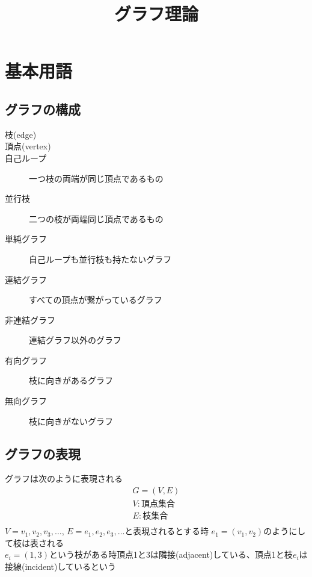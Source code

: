 \documentclass[a4j,10.5pt]{jarticle}
\title{グラフ理論}
\theoremstyle{break}
\begin{document}
\maketitle

\section{基本用語}
\subsection{グラフの構成}
\begin{description}
\item [枝(edge)]
\item [頂点(vertex)]
\item [自己ループ] 一つ枝の両端が同じ頂点であるもの
\item [並行枝] 二つの枝が両端同じ頂点であるもの
\item [単純グラフ] 自己ループも並行枝も持たないグラフ
\end{description}

\begin{description}
\item[連結グラフ] すべての頂点が繋がっているグラフ
\item[非連結グラフ] 連結グラフ以外のグラフ
\end{description}

\begin{description}
\item[有向グラフ] 枝に向きがあるグラフ
\item[無向グラフ] 枝に向きがないグラフ
\end{description}

\subsection{グラフの表現}
グラフは次のように表現される
\begin{eqnarray*}
G=(V,E) \\
V:頂点集合 \\
E:枝集合 \\
\end{eqnarray*}
$V = {v_1,v_2,v_3,\dots}$,
$E = {e_1,e_2,e_3,\dots}$と表現されるとする時
$e_1 = (v_1,v_2)$のようにして枝は表される\\

$e_i = (1,3)$という枝がある時頂点1と3は隣接(adjacent)している、頂点1と枝$e_i$は接線(incident)しているという
\end{document}
